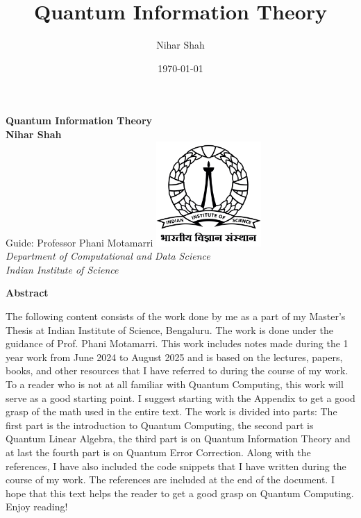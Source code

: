 \documentclass[12pt, oneside]{book}
\theoremstyle{definition}
\theoremstyle{definition}
\theoremstyle{remark}
\newcommand{\abstractname}{Abstract}
\newenvironment{abstract}{%
\clearpage
\null\vfill
\begin{center}%
    \bfseries \abstractname
\end{center}}%
{\vfill\null}
\begin{document}
\frontmatter

\title{\vspace{-3.0cm}Quantum Information Theory}  %
\author{Nihar Shah}  %
\date{\today}  %
\maketitle  %

\begin{center}
\vspace*{2cm}
\textbf{Quantum Information Theory}\\[1cm]
\textbf{Nihar Shah}\\[1cm]
Guide: Professor Phani Motamarri
\vfill
\includegraphics[width=0.3\textwidth]{images/IISc_Master_Seal_Black.jpg}\\[1cm]
\large \textit{Department of Computational and Data Science}\\
\large \textit{Indian Institute of Science}
\vfill
\end{center}

\frontmatter

\begin{abstract}
The following content consists of the work done by me as a part of my Master's Thesis at Indian
Institute of Science, Bengaluru. The work is done under the guidance of Prof. Phani Motamarri. 
This work includes notes made during the 1 year work from June 2024 to August 2025 and is based on the
lectures, papers, books, and other resources that I have referred to during the course of my work.
To a reader who is not at all familiar with Quantum Computing, this work will serve as a good starting point. 
I suggest starting with the Appendix to get a good grasp of the math used in the entire text. 
The work is divided into parts: The first part is the introduction to Quantum Computing, the second part is Quantum Linear Algebra, the third part is on Quantum Information Theory and at last the fourth part is on Quantum Error Correction. Along with the references, 
I have also included the code snippets that I have written during the course of my work. The references are included at the end of the document.
I hope that this text helps the reader to get a good grasp on Quantum Computing. Enjoy reading!
\end{abstract}
\end{document}
